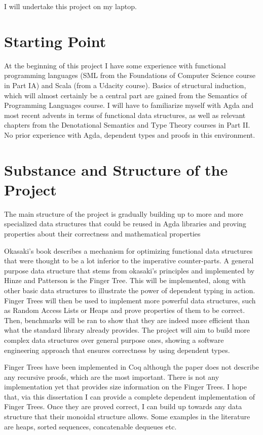 \documentclass[12pt]{article}
\begin{document}
I will undertake this project on my laptop.

\section*{Starting Point}

At the beginning of this project I have some experience with functional programming
languages (SML from the Foundations of Computer Science course in Part IA) and Scala
(from a Udacity course). Basics of structural induction, which will almost certainly
be a central part are gained from the Semantics of Programming Languages course.
I will have to familiarize myself with Agda and most recent advents in terms of
functional data structures, as well as relevant chapters from the
Denotational Semantics and Type Theory courses in Part II.
No prior experience with Agda, dependent types and proofs in this environment.

\section*{Substance and Structure of the Project}

The main structure of the project is gradually building up to more and more
specialized data structures that could be reused in Agda libraries and proving
properties about their correctness and mathematical properties

Okasaki's book describes a mechanism for optimizing functional data structures
that were thought to be a lot inferior to the imperative counter-parts.
A general purpose data structure that stems from okasaki's principles and implemented
by Hinze and Patterson \cite{fingertrees} is the Finger Tree.
This will be implemented, along with other basic data structures to
illustrate the power of dependent typing in action. Finger Trees will then be used
to implement more powerful data structures, such as Random Access Lists or
Heaps and prove properties of them to be correct. Then, benchmarks will be ran to
show that they are indeed more efficient than what the standard library already provides.
The project will aim to build more complex data structures over general
purpose ones, showing a software engineering approach that ensures correctness
by using dependent types.

Finger Trees have been implemented in Coq \cite{fingertrees} although the paper does not describe
any recursive proofs, which are the most important. There is not any implementation
yet that provides size information on the Finger Trees. I hope that, via this
dissertation I can provide a complete dependent implementation of Finger Trees.
Once they are proved correct, I can build up towards any data structure that
their monoidal structure allows. Some examples in the literature are heaps,
sorted sequences, concatenable dequeues etc.
\end{document}
